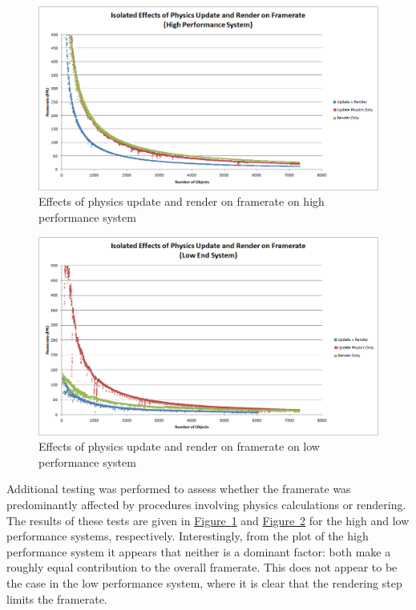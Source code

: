 \documentclass[12pt, titlepage]{article}
\begin{document}
\begin{figure}[H]
\centering
\includegraphics[width=\textwidth]{isolatedhigh}
\caption{Effects of physics update and render on framerate on high performance system} \label{fig:isohi}
\end{figure}


\begin{figure}[H]
\centering
\includegraphics[width=\textwidth]{isolatedlo}
\caption{Effects of physics update and render on framerate on low performance system} \label{fig:isolo}
\end{figure}

Additional testing was performed to assess whether the framerate was predominantly affected by procedures involving physics calculations or rendering.  The results of these tests are given in \hyperref[fig:isohi]{Figure~\ref*{fig:isohi}} and \hyperref[fig:isolo]{Figure~\ref*{fig:isolo}} for the high and low performance systems, respectively.  Interestingly, from the plot of the high performance system it appears that neither is a dominant factor:  both make a roughly equal contribution to the overall framerate.  This does not appear to be the case in the low performance system, where it is clear that the rendering step limits the framerate.  
\end{document}
